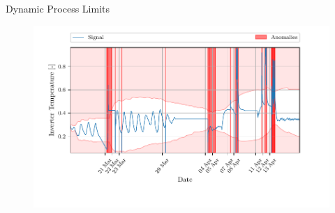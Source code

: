 \documentclass{beamer}
\begin{document}
\begin{frame}{Dynamic Process Limits}
    \begin{figure}[htpb]
        \begin{center}
            \includegraphics[width=\linewidth]{figures/Inverter_Temperature_sliding_thresh.pdf}
        \end{center}
    \end{figure}
\end{frame}
\end{document}
